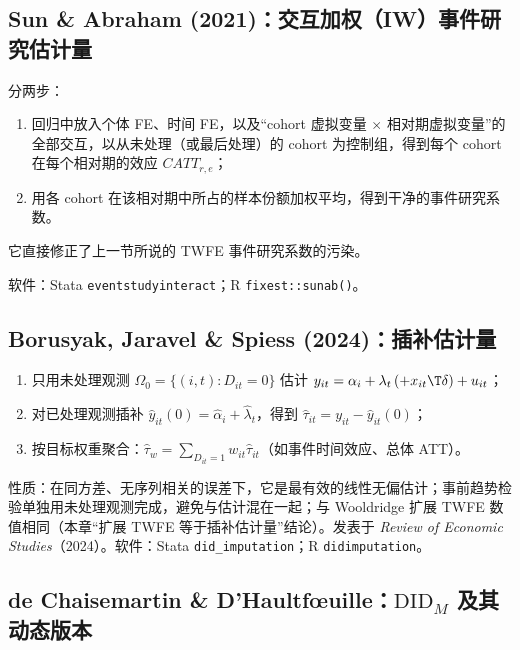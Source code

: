 \subsection{Sun \& Abraham (2021)：交互加权（IW）事件研究估计量}

分两步：
\begin{enumerate}
  \item 回归中放入个体 FE、时间 FE，以及“cohort 虚拟变量 $\times$ 相对期虚拟变量”的全部交互，以从未处理（或最后处理）的 cohort 为控制组，得到每个 cohort 在每个相对期的效应 $CATT_{r,e}$；
  \item 用各 cohort 在该相对期中所占的样本份额加权平均，得到干净的事件研究系数。
\end{enumerate}
它直接修正了上一节所说的 TWFE 事件研究系数的污染。

软件：Stata \texttt{eventstudyinteract}；R \texttt{fixest::sunab()}。

\subsection{Borusyak, Jaravel \& Spiess (2024)：插补估计量}

\begin{method}
\begin{enumerate}
  \item 只用未处理观测 $\Omega_0=\{(i,t):D_{it}=0\}$ 估计 $y_{it}=\alpha_i+\lambda_t\,(+x_{it}\T\delta)+u_{it}$；
  \item 对已处理观测插补 $\hat y_{it}(0)=\hat\alpha_i+\hat\lambda_t$，得到 $\hat\tau_{it}=y_{it}-\hat y_{it}(0)$；
  \item 按目标权重聚合：$\hat\tau_w=\sum_{D_{it}=1}w_{it}\hat\tau_{it}$（如事件时间效应、总体 ATT）。
\end{enumerate}
\end{method}

性质：在同方差、无序列相关的误差下，它是最有效的线性无偏估计；事前趋势检验单独用未处理观测完成，避免与估计混在一起；与 Wooldridge 扩展 TWFE 数值相同（本章“扩展 TWFE 等于插补估计量”结论）。发表于 \emph{Review of Economic Studies}（2024）。软件：Stata \texttt{did\_imputation}；R \texttt{didimputation}。

\subsection{de Chaisemartin \& D'Haultf{\oe}uille：\texorpdfstring{$\mathrm{DID}_M$}{DID\_M} 及其动态版本}

